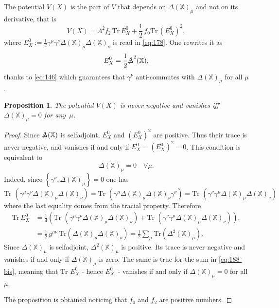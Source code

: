 \documentclass[11pt]{article}
\newcommand{\XX}{{\mathbb X}}
\newtheorem{prop}{Proposition}[section]
\begin{document}
The potential
$V(X)$ is the part of $V$ that depends on $\Delta(\XX)_\mu$
and not on its derivative, that is
\begin{equation}
  \label{eq:184}
  V(X) = \Lambda^2 f_2 \,\text{Tr}\, E_X^0 + \frac 12\, f_0
  \text{Tr}\,  (E_X^0)^2,
\end{equation}
where $  E_X^0 := \frac 12 \gamma^\mu\gamma^\nu \Delta(\XX)_\mu
\Delta(\XX)_\nu$ is read in \eqref{eq:178}. One rewrites it as
\begin{equation}
  \label{eq:183}
  E_X^0 = \frac 12 \slashed\Delta^2(\XX),
\end{equation}
thanks to \eqref{eq:146} which guarantees that $\gamma^\nu$ anti-commutes with $\Delta(\XX)_\mu$
for all $\mu$.
\begin{prop}
  The potential $V(X)$ is never negative and vanishes iff
  $\Delta(\XX)_\mu =0$ for any~$\mu$.
\end{prop}
\begin{proof}
Since $\slashed\Delta(\XX) $ is selfadjoint, $E_X^0$ and $(E_X^0)^2$ are
positive. Thus their trace is never negative, and vanishes if and only
if $E_X^0=(E_X^0)^2=0$. This condition is equivalent to 
\begin{equation}
  \label{eq:181}
  \Delta(\XX)_\mu = 0 \quad \forall \mu. 
\end{equation}
Indeed, since $\left\{\gamma^\nu,\Delta(\XX)_\mu\right\}=0$ one has
\begin{equation}
  \label{eq:175bis}
  \text{Tr }(\gamma^\mu\gamma^\nu \Delta(\XX)_\mu \Delta(\XX)_\nu) =
  \text{Tr }(\gamma^\mu \Delta(\XX)_\mu \Delta(\XX)_\nu\gamma^\nu) =   \text{Tr }(\gamma^\nu\gamma^\mu \Delta(\XX)_\mu \Delta(\XX)_\nu)
\end{equation}
where the last equality comes from the tracial property. Therefore
\begin{align}
  \label{eq:188}
  \text{Tr} \, E_X^0 &=  \frac 14 (\text{Tr }(\gamma^\mu\gamma^\nu
  \Delta(\XX)_\mu \Delta(\XX)_\nu) +  \text{Tr }(\gamma^\nu\gamma^\mu
  \Delta(\XX)_\mu \Delta(\XX)_\nu)),\\
\label{eq:188-bis}
&= \frac 12 \, g^{\mu\nu} \,\text{Tr}(\Delta(\XX)_\mu \Delta(\XX)_\nu)
=\frac 12\sum_\mu  \text{Tr} \left(\Delta^2(\XX)_\mu\right) .
\end{align}
Since $\Delta(\XX)_\mu$ is selfadjoint, $\Delta^2(\XX)_\mu$ is
positive. Its trace is never negative and vanishes if and only if
$\Delta(\XX)_\mu$ is zero. The same is true for the sum in
\eqref{eq:188-bis}, meaning that $\text{Tr } E_X^0$ - hence $E_X^0$~- vanishes if and only if
$\Delta(\XX)_\mu = 0$  for all  $\mu$. 

The
proposition is obtained noticing that  $f_0$ and $f_2$ are positive numbers.
\end{proof}
\end{document}
